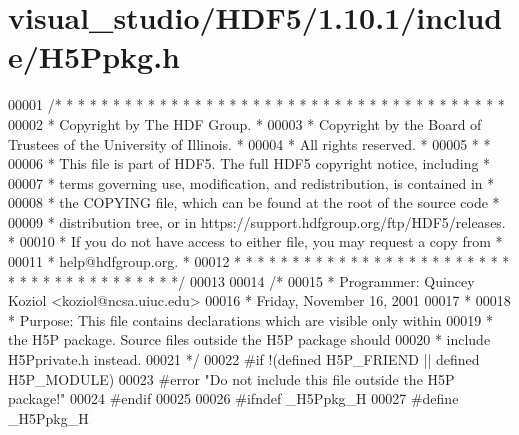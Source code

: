 \hypertarget{visual__studio_2_h_d_f5_21_810_81_2include_2_h5_ppkg_8h_source}{}\section{visual\+\_\+studio/\+H\+D\+F5/1.10.1/include/\+H5\+Ppkg.h}
\label{visual__studio_2_h_d_f5_21_810_81_2include_2_h5_ppkg_8h_source}

\begin{DoxyCode}
00001 \textcolor{comment}{/* * * * * * * * * * * * * * * * * * * * * * * * * * * * * * * * * * * * * * *}
00002 \textcolor{comment}{ * Copyright by The HDF Group.                                               *}
00003 \textcolor{comment}{ * Copyright by the Board of Trustees of the University of Illinois.         *}
00004 \textcolor{comment}{ * All rights reserved.                                                      *}
00005 \textcolor{comment}{ *                                                                           *}
00006 \textcolor{comment}{ * This file is part of HDF5.  The full HDF5 copyright notice, including     *}
00007 \textcolor{comment}{ * terms governing use, modification, and redistribution, is contained in    *}
00008 \textcolor{comment}{ * the COPYING file, which can be found at the root of the source code       *}
00009 \textcolor{comment}{ * distribution tree, or in https://support.hdfgroup.org/ftp/HDF5/releases.  *}
00010 \textcolor{comment}{ * If you do not have access to either file, you may request a copy from     *}
00011 \textcolor{comment}{ * help@hdfgroup.org.                                                        *}
00012 \textcolor{comment}{ * * * * * * * * * * * * * * * * * * * * * * * * * * * * * * * * * * * * * * */}
00013 
00014 \textcolor{comment}{/*}
00015 \textcolor{comment}{ * Programmer:  Quincey Koziol <koziol@ncsa.uiuc.edu>}
00016 \textcolor{comment}{ *      Friday, November 16, 2001}
00017 \textcolor{comment}{ *}
00018 \textcolor{comment}{ * Purpose: This file contains declarations which are visible only within}
00019 \textcolor{comment}{ *      the H5P package.  Source files outside the H5P package should}
00020 \textcolor{comment}{ *      include H5Pprivate.h instead.}
00021 \textcolor{comment}{ */}
00022 \textcolor{preprocessor}{#if !(defined H5P\_FRIEND || defined H5P\_MODULE)}
00023 \textcolor{preprocessor}{#error "Do not include this file outside the H5P package!"}
00024 \textcolor{preprocessor}{#endif}
00025 
00026 \textcolor{preprocessor}{#ifndef \_H5Ppkg\_H}
00027 \textcolor{preprocessor}{#define \_H5Ppkg\_H}

\end{DoxyCode}
